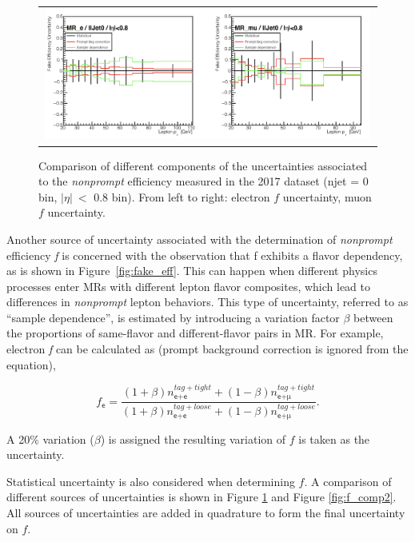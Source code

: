 \begin{figure}[tbh!]
 \begin{center}
 \begin{tabular}{c}
 \includegraphics[width=0.99\textwidth]{figures/Part3/Systematics/MR1}
 \end{tabular}
 \caption{Comparison of different components of the uncertainties associated to the \emph{nonprompt} efficiency measured in the 2017 dataset (njet = 0 bin, $|\eta|~<$ 0.8 bin). From left to right: electron $f$ uncertainty, muon $f$ uncertainty.}
 \label{fig:f_comp1}
 \end{center}
\end{figure}

Another source of uncertainty associated with the determination of \emph{nonprompt} efficiency \emph{f} is concerned with the observation that f exhibits a flavor dependency, as is shown in Figure~\ref{fig:fake_eff}. This can happen when different physics processes enter \acp{MR} with different lepton flavor composites, which lead to differences in \emph{nonprompt} lepton behaviors. This type of uncertainty, referred to as ``sample dependence'', is estimated by introducing a variation factor $\beta$ between the proportions of same-flavor and different-flavor pairs in \ac{MR}. For example, electron \emph{f} can be calculated as (prompt background correction is ignored from the equation),

\begin{equation}
f_{\textsf{e}}=\frac{(1+\beta)n_{\textsf{e+e}}^{tag+tight}+(1-\beta)n_{\textsf{e+}\upmu}^{tag+tight}}{(1+\beta)n_{\textsf{e+e}}^{tag+loose}+(1-\beta)n_{\textsf{e+}\upmu}^{tag+loose}}.
 \label{eq:samp_dep}
\end{equation}

A 20$\%$ variation ($\beta$) is assigned the resulting variation of $f$ is taken as the uncertainty.
 
Statistical uncertainty is also considered when determining $f$. A comparison of different sources of uncertainties is shown in Figure \ref{fig:f_comp1} and Figure \ref{fig:f_comp2}. All sources of uncertainties are added in quadrature to form the final uncertainty on $f$. 

